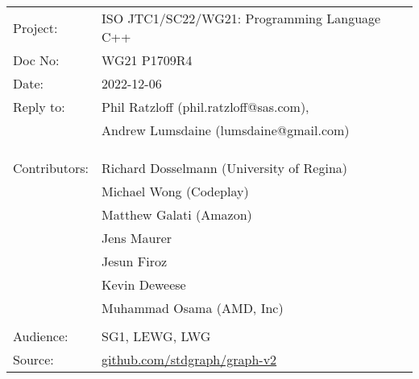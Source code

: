 \documentclass[10pt,oneside,openany,final]{memoir}
\begin{document}
\pagestyle{cpppage}


\begin{tabular}{@{}ll}
  Project:      & ISO JTC1/SC22/WG21: Programming Language C++           \\
  Doc No:       & WG21 P1709R4                                           \\
  Date:         & 2022-12-06                                             \\
  Reply to:     & Phil Ratzloff (phil.ratzloff@sas.com),                 \\
                & Andrew Lumsdaine (lumsdaine@gmail.com)                 \\
                &                                                        \\
                &                                                        \\
                &                                                        \\
  Contributors: & Richard Dosselmann (University of Regina)              \\
                & Michael Wong (Codeplay)                                \\
                & Matthew Galati (Amazon)                                \\
                & Jens Maurer                                            \\
                & Jesun Firoz                                            \\
                & Kevin Deweese                                          \\
                & Muhammad Osama (AMD, Inc)                              \\
                &                                                        \\
  Audience:     & SG1, LEWG, LWG                                         \\
  Source:       & \href{https://github.com/stdgraph/graph-v2}{github.com/stdgraph/graph-v2}    \\
\end{tabular}
\end{document}
